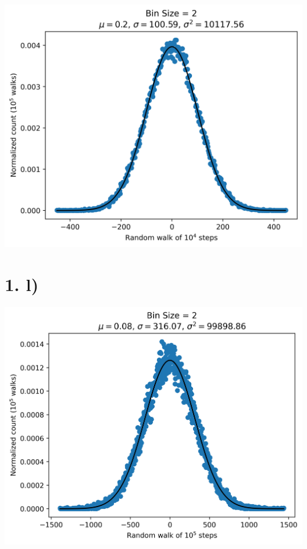 \documentclass{article}
\begin{document}
\begin{center}
    \includegraphics[scale=0.8]{1k.png}
\end{center}

\section*{1. l)}

\begin{center}
    \includegraphics[scale=0.8]{1l.png}
\end{center}
\end{document}
